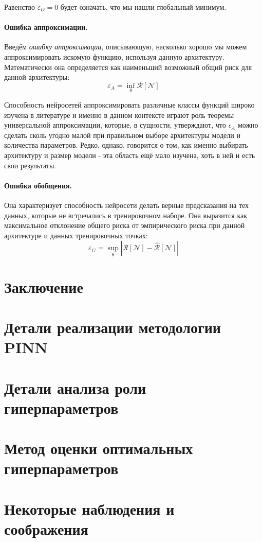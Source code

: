 \documentclass[a4paper, 12pt]{article}
\begin{document}
Равенство $\varepsilon_O = 0$ будет означать, что мы нашли глобальный минимум.

\paragraph{Ошибка аппроксимации.} Введём \textit{ошибку аппроксимации}, описывающую, насколько хорошо мы можем аппроксимировать искомую функцию, используя данную архитектуру. Математически она определяется как наименьший возможный общий риск для данной архитектуры:
$$
\varepsilon_A = \inf_{\theta}\mathcal{R}[\mathcal{N}]
$$

Способность нейросетей аппроксимировать различные классы функций широко изучена в литературе и именно в данном контексте играют роль теоремы универсальной аппроксимации, которые, в сущности, утверждают, что $\epsilon_A$ можно сделать сколь угодно малой при правильном выборе архитектуры модели и количества параметров. Редко, однако, говорится о том, как именно выбирать архитектуру и размер модели - эта область ещё мало изучена, хоть в ней и есть свои результаты.

\paragraph{Ошибка обобщения.} Она характеризует способность нейросети делать верные предсказания на тех данных, которые не встречались в тренировочном наборе. Она выразится как максимальное отклонение общего риска от эмпирического риска при данной архитектуре и данных тренировочных точках:
$$
\varepsilon_G = \sup_{\theta}|\mathcal{R}[\mathcal{N}] - \hat{\mathcal{R}}[\mathcal{N}]|
$$

\section*{Заключение} \label{section:conclusion}

\printbibliography[heading=bibintoc,title={Список источников}]

\appendix

\section{Детали реализации методологии PINN} \label{section:appendix:pinn}

\section{Детали анализа роли гиперпараметров} \label{section:appendix:hyperparameters}

\section{Метод оценки оптимальных гиперпараметров} \label{section:appendix:hpo}

\section{Некоторые наблюдения и соображения} \label{section:appendix:thoughts}
\end{document}
